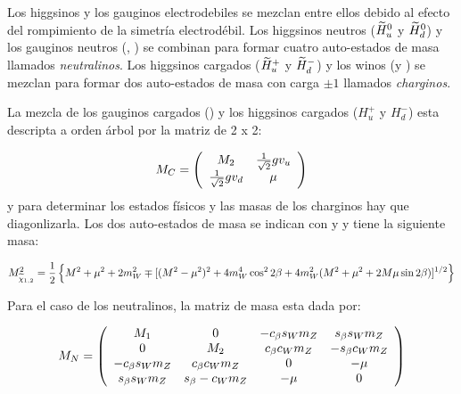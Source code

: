 Los higgsinos y los gauginos electrodebiles se mezclan entre ellos debido al
efecto del rompimiento de la simetría electrodébil. Los higgsinos neutros
($\widetilde{H}_u^0$ y $\widetilde{H}_d^0$) y los gauginos neutros (\bino, \winozero) se
combinan para formar cuatro auto-estados de masa llamados \emph{neutralinos}.
Los higgsinos cargados ($\widetilde{H}_u^+$ y $\widetilde{H}_d^-$) y los winos (\winop y
\winom) se mezclan para formar dos auto-estados de masa con carga $\pm 1$
llamados \emph{charginos}.

La mezcla de los gauginos cargados (\winopm) y los higgsinos cargados ($H_u^+$ y
$H_d^-$) esta descripta a orden árbol por la matriz de 2 x 2:

\begin{equation}
  M_{C} = \left(
  \begin{array}{cc}
    M_{2} & \frac{1}{\sqrt{2}} g v_u \\ \frac{1}{\sqrt{2}} g v_d & \mu \\
  \end{array}
  \right)
\end{equation}
%
y para determinar los estados físicos y las masas de los charginos hay que
diagonlizarla. Los dos auto-estados de masa se indican con {\chinoonepm} y
{\chinotwopm} y tiene la siguiente masa:

\begin{equation}
  M^2_{\widetilde{\chi}_{1,2}} = \frac{1}{2} \left\{ M^2 + \mu^2 + 2 m_W^2 \mp
  [(M^2-\mu^2)^2 + 4 m_W^4 \cos^2 2\beta + 4 m_W^2 (M^2+\mu^2 + 2 M \mu \sin
    2\beta)]^{1/2} \right\}
\end{equation}



Para el caso de los neutralinos, la matriz de masa esta dada por:

\begin{equation}
  M_{N} = \left(
  \begin{array}{cccc}
    M_{1} & 0 & -c_\beta s_W m_Z & s_\beta s_W m_Z \\ 0 & M_{2} & c_\beta c_W
    m_Z & -s_\beta c_W m_Z \\

    -c_\beta s_W m_Z & c_\beta c_W m_Z & 0 & -\mu \\ s_\beta s_W m_Z & s_\beta
    -c_W m_Z & -\mu & 0 \\
  \end{array}
  \right)
\end{equation}

